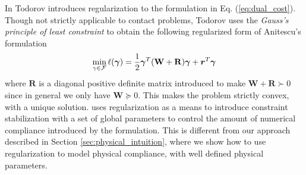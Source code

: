 In \cite{bib:todorov2011, bib:todorov2014} Todorov introduces regularization to
the formulation in Eq. (\ref{eq:dual_cost}). Though not strictly applicable to
contact problems, Todorov uses the \emph{Gauss's principle of least
constraint} to obtain the following regularized form of Anitescu's formulation
\begin{eqnarray}
	\min_{\gamma\in \mathcal{F}} \ell(\bgamma) =
	\frac{1}{2}\bgamma^T(\mathbf{W}+\mathbf{R})\bgamma + {\bm r}^T
	\bgamma
	\label{eq:dual_regularized}
\end{eqnarray}
where $\mathbf{R}$ is a diagonal positive definite matrix introduced to make
$\mathbf{W}+\mathbf{R}\succ 0$ since in general we only have $\mathbf{W} \succeq
0$. This makes the problem strictly convex, with a unique solution.
\cite{bib:todorov2014} uses regularization as a means to introduce constraint
stabilization with a set of global parameters to control the amount of numerical
compliance introduced by the formulation. This is different from our approach
described in Section \ref{sec:physical_intuition}, where we show how to use
regularization to model physical compliance, with well defined physical
parameters.
